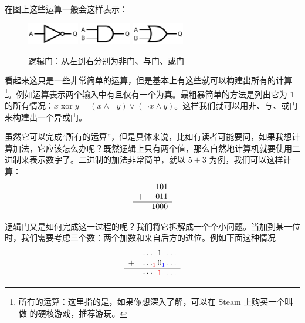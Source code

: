 在图上这些运算一般会这样表示：
\begin{figure}[H]
    \centering
    \includegraphics[width=0.2\textwidth]{img/not_gate.png}\quad
    \includegraphics[width=0.2\textwidth]{img/and_gate.png}\quad
    \includegraphics[width=0.2\textwidth]{img/or_gate.png}
    \caption{逻辑门：从左到右分别为非门、与门、或门}
\end{figure}

看起来这只是一些非常简单的运算，但是基本上有这些就可以构建出所有的计算\footnote{所有的运算：这里指的是，如果你想深入了解，可以在 Steam 上购买一个叫做  的硬核游戏，推荐游玩。}。例如运算表示两个输入中有且仅有一个为真。最粗暴简单的方法是列出它为 1 的所有情况：$x \; \text{xor} \; y = (x\land \neg y) \lor (\neg x \land y)$。这样我们就可以用非、与、或门来构建出一个异或门。

虽然它可以完成“所有的运算”，但是具体来说，比如有读者可能要问，如果我想计算加法，它应该怎么办呢？既然逻辑上只有两个值，那么自然地计算机就要使用二进制来表示数字了。二进制的加法非常简单，就以 $5+3$ 为例，我们可以这样计算：
\[
    \begin{array}{rr}
        &101 \\
        + & 011 \\
        \hline
        & 1000
    \end{array}
\]

逻辑门又是如何完成这一过程的呢？我们将它拆解成一个个小问题。当加到某一位时，我们需要考虑三个数：两个加数和来自后方的进位。例如下面这种情况
\[
    \begin{array}{rr}
        &\ldots_{\phantom{0}} 1_{\phantom{0}} \color{lightgray}\ldots\\
        + &\ldots_{\color{red}1} 0_{\color{blue}1} \color{lightgray}\ldots\\
        \hline
        & \cdots_{\phantom{0}} {\color{red}1}_{\phantom{0}} \color{lightgray}\ldots
    \end{array}
\]

